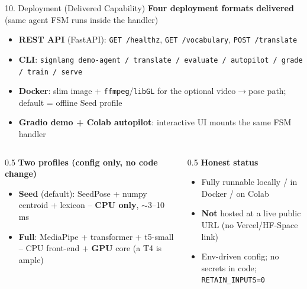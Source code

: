 \documentclass[10pt,aspectratio=169]{beamer}
\begin{document}
\begin{frame}{10. Deployment (Delivered Capability)}
\textbf{Four deployment formats delivered} (same agent FSM runs inside the handler)
\begin{itemize}\small
  \item \textbf{REST API} (FastAPI): \texttt{GET /healthz}, \texttt{GET /vocabulary}, \texttt{POST /translate}
  \item \textbf{CLI}: \texttt{signlang demo-agent / translate / evaluate / autopilot / grade / train / serve}
  \item \textbf{Docker}: slim image + \texttt{ffmpeg}/\texttt{libGL} for the optional video$\rightarrow$pose path; default = offline Seed profile
  \item \textbf{Gradio demo + Colab autopilot}: interactive UI mounts the same FSM handler
\end{itemize}

\begin{columns}[T]
\begin{column}{0.5\textwidth}
\textbf{Two profiles (config only, no code change)}
\begin{itemize}\small
  \item \textbf{Seed} (default): SeedPose + numpy centroid + lexicon -- \textbf{CPU only}, $\sim$3--10\,ms
  \item \textbf{Full}: MediaPipe + transformer + t5-small -- CPU front-end + \textbf{GPU} core (a T4 is ample)
\end{itemize}
\end{column}
\begin{column}{0.5\textwidth}
\textbf{Honest status}
\begin{itemize}\small
  \item Fully runnable locally / in Docker / on Colab
  \item \textbf{Not} hosted at a live public URL (no Vercel/HF-Space link)
  \item Env-driven config; no secrets in code; \texttt{RETAIN\_INPUTS=0}
\end{itemize}
\end{column}
\end{columns}
\end{frame}
\end{document}
